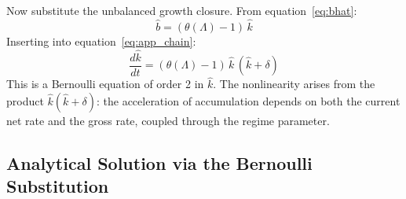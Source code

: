 Now substitute the unbalanced growth closure. From equation~\eqref{eq:bhat}:
%
\begin{equation}\label{eq:app_bhat}
	\hat{b} = (\theta(\Lambda) - 1) \, \hat{k}
\end{equation}
%
Inserting into equation~\eqref{eq:app_chain}:
%
\begin{equation}\label{eq:app_bernoulli}
	\boxed{\frac{d\hat{k}}{dt} = (\theta(\Lambda) - 1) \, \hat{k} \, (\hat{k} + \delta)}
\end{equation}
%
This is a Bernoulli equation of order 2 in $\hat{k}$. The nonlinearity arises from the product $\hat{k}(\hat{k} + \delta)$: the acceleration of accumulation depends on both the current net rate and the gross rate, coupled through the regime parameter.


\subsection{Analytical Solution via the Bernoulli Substitution}
\label{app:bernoulli_solution}

